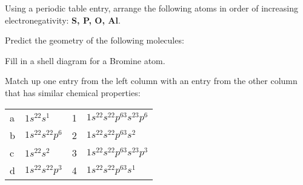 \documentclass[10pt]{exam}
\begin{document}
\begin{questions}


\question Using a periodic table entry, arrange the following atoms in
order of increasing electronegativity:  \textbf{S, P, O, Al}.

\question Predict the geometry of the following molecules:
\begin{parts}


\end{parts}


\question Fill in a shell diagram for a Bromine atom.

\question Match up one entry from the left column with an entry from the other
  column that has similar chemical properties:

\begin{tabular}{|l|l|l|l|}

a& $1s^22s^1$ & 1& $1s^22s^22p^63s^23p^6$ \\
b& $1s^22s^22p^6$ & 2& $1s^22s^22p^63s^2$ \\
c& $1s^22s^2$ & 3& $1s^22s^22p^63s^23p^3$ \\
d& $1s^22s^22p^3$ & 4&$1s^22s^22p^63s^1$  
\end{tabular}

\end{questions}
\end{document}
